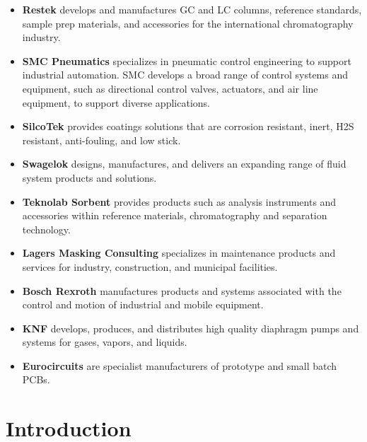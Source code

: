 \documentclass[a4paper,12pt,oneside]{article}
\begin{document}
\begin{itemize}
  \item \textbf{Restek} develops and manufactures GC and LC columns, reference standards, sample prep materials, and accessories for the international chromatography industry. 
  \item \textbf{SMC Pneumatics} specializes in pneumatic control engineering to support industrial automation. SMC develops a broad range of control systems and equipment, such as directional control valves, actuators, and air line equipment, to support diverse applications.
  \item \textbf{SilcoTek} provides coatings solutions that are corrosion resistant, inert, H2S resistant, anti-fouling, and low stick.
  \item \textbf{Swagelok} designs, manufactures, and delivers an expanding range of fluid system products and solutions.
  \item \textbf{Teknolab Sorbent} provides products such as  analysis instruments and accessories within reference materials, chromatography and separation technology.
  \item \textbf{Lagers Masking Consulting} specializes in maintenance products and services for industry, construction, and municipal facilities.
  \item \textbf{Bosch Rexroth} manufactures products and systems associated with the control and motion of industrial and mobile equipment.
  \item \textbf{KNF} develops, produces, and distributes high quality diaphragm pumps and systems for gases, vapors, and liquids.
  \item \textbf{Eurocircuits} are specialist manufacturers of prototype and small batch PCBs.
\end{itemize}

\pagestyle{SED}
\raggedbottom  %

%

\section{Introduction}
\end{document}
